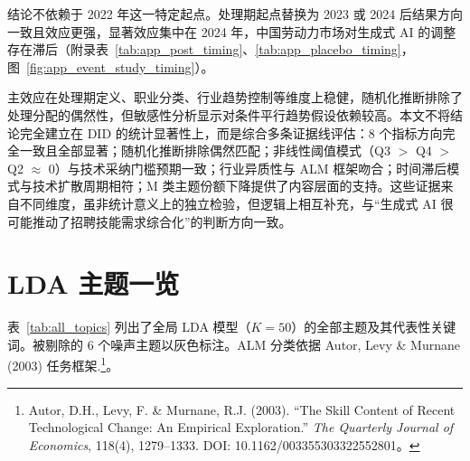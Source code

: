 \documentclass[12pt, a4paper]{article}
\begin{document}
结论不依赖于 2022 年这一特定起点。处理期起点替换为 2023 或 2024 后结果方向一致且效应更强，显著效应集中在 2024 年，中国劳动力市场对生成式 AI 的调整存在滞后（附录表~\ref{tab:app_post_timing}、\ref{tab:app_placebo_timing}，图~\ref{fig:app_event_study_timing}）。

主效应在处理期定义、职业分类、行业趋势控制等维度上稳健，随机化推断排除了处理分配的偶然性，但敏感性分析显示对条件平行趋势假设依赖较高。本文不将结论完全建立在 DID 的统计显著性上，而是综合多条证据线评估：8 个指标方向完全一致且全部显著；随机化推断排除偶然匹配；非线性阈值模式（Q3 $>$ Q4 $>$ Q2 $\approx$ 0）与技术采纳门槛预期一致；行业异质性与 ALM 框架吻合；时间滞后模式与技术扩散周期相符；M 类主题份额下降提供了内容层面的支持。这些证据来自不同维度，虽非统计意义上的独立检验，但逻辑上相互补充，与``生成式 AI 很可能推动了招聘技能需求综合化''的判断方向一致。

\appendix
\section{LDA 主题一览}

表~\ref{tab:all_topics} 列出了全局 LDA 模型（$K=50$）的全部主题及其代表性关键词。被剔除的 6 个噪声主题以灰色标注。ALM 分类依据 Autor, Levy \& Murnane (2003) 任务框架.\footnote{Autor, D.H., Levy, F. \& Murnane, R.J. (2003). ``The Skill Content of Recent Technological Change: An Empirical Exploration.'' \textit{The Quarterly Journal of Economics}, 118(4), 1279--1333. DOI: 10.1162/003355303322552801。}。
\end{document}
